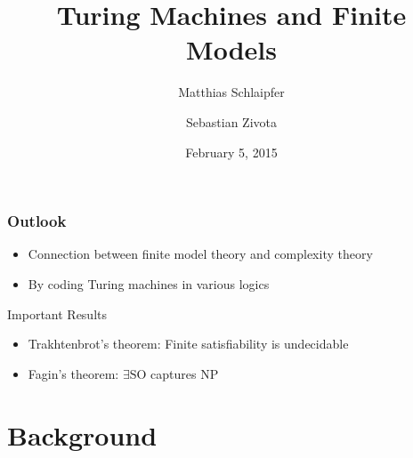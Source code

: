 \documentclass{beamer}
\title{Turing Machines and Finite Models}
\author{Matthias Schlaipfer \and Sebastian Zivota}
\date{February 5, 2015}
\newcommand{\SO}{\ensuremath{\mathrm{SO}}}
\begin{document}
\begin{frame}[plain]
	\titlepage
\end{frame}


\begin{frame}
  \frametitle{Outlook}
  \begin{itemize}
    \item Connection between finite model theory and complexity theory
    \item By coding Turing machines in various logics
  \end{itemize}
  \vspace{2em} 
  \begin{alertblock}{Important Results}
  \begin{itemize}
    \item Trakhtenbrot's theorem: Finite satisfiability is undecidable
    \item Fagin's theorem: $\exists \SO$ captures $\mathrm{NP}$
  \end{itemize}
  \end{alertblock}
\end{frame}

\section{Background}
\end{document}
